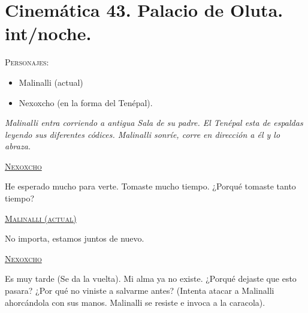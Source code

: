 \section{Cinemática 43. Palacio de Oluta. int/noche. }
\label{Cin:Cinematica43}
 \textsc{Personajes}:
 \begin{itemize}
 \item Malinalli (actual)
\item Nexoxcho (en la forma del Tenépal).
 \end{itemize}
\textit{Malinalli entra corriendo a antigua Sala de su padre. El Tenépal esta de espaldas leyendo sus diferentes códices. Malinalli sonríe, corre en dirección a él y lo abraza. }
\begin{center}
\textsc{\underline{Nexoxcho}}
\\
\par 
He esperado mucho para verte. Tomaste mucho tiempo. ¿Porqué tomaste tanto tiempo?
\\
\par 
\textsc{\underline{Malinalli (actual)}} 
\\
\par 
No importa, estamos juntos de nuevo.
\\
\par 
\textsc{\underline{Nexoxcho}}
\\
\par 
Es muy tarde (Se da la vuelta). Mi alma ya no existe. ¿Porqué dejaste que esto pasara? ¿Por qué no viniste a salvarme antes? (Intenta atacar a Malinalli ahorcándola con sus manos. Malinalli se resiste e invoca a la caracola). 
\end{center}